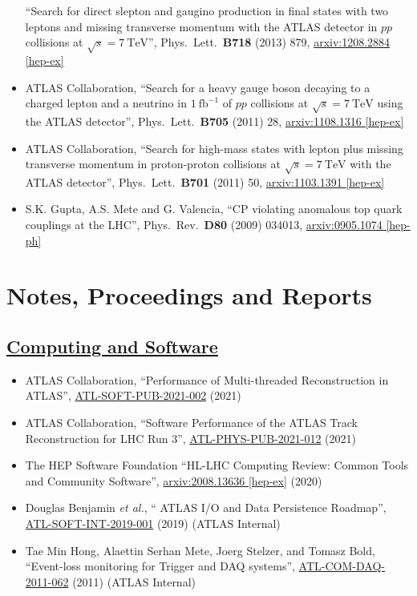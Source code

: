 \documentclass[a4paper,10pt]{article}
\begin{document}
\begin{itemize}
	``Search for direct slepton and gaugino production in final states with two leptons and missing transverse momentum with the ATLAS detector in $pp$ collisions at $\sqrt{s} = 7\ \mathrm{TeV}$'', 
	Phys.\ Lett.\ {\bf B718} (2013) 879, \href{http://arxiv.org/abs/1208.2884}{arxiv:1208.2884 [hep-ex]}
	\item ATLAS Collaboration,
	``Search for a heavy gauge boson decaying to a charged lepton and a neutrino in $1\ \mathrm{fb}^{-1}$ of $pp$ collisions at $\sqrt{s} = 7\ \mathrm{TeV}$ using the ATLAS detector'', 
	Phys.\ Lett.\ {\bf B705} (2011) 28, 
	\href{http://arxiv.org/abs/arXiv:1108.1316}{arxiv:1108.1316 [hep-ex]}
	\item ATLAS Collaboration,
	``Search for high-mass states with lepton plus missing transverse momentum in proton-proton collisions at $\sqrt{s} = 7\ \mathrm{TeV}$ with the ATLAS detector'', 
	Phys.\ Lett.\ {\bf B701} (2011) 50, 
	\href{http://arxiv.org/abs/1103.1391}{arxiv:1103.1391 [hep-ex]}
	\item S.K. Gupta, A.S. Mete and G. Valencia,
	``CP violating anomalous top quark couplings at the LHC'',  
	Phys.\ Rev.\ {\bf D80} (2009) 034013, 
	\href{http://arxiv.org/abs/0905.1074}{arxiv:0905.1074 [hep-ph]}
\end{itemize}


\section{Notes, Proceedings and Reports}
\vspace{1mm}
\subsection{\underline{Computing and Software}}
\vspace{1mm}
\begin{itemize}
	\item ATLAS Collaboration,
	``Performance of Multi-threaded Reconstruction in ATLAS'',
	\href{https://atlas.web.cern.ch/Atlas/GROUPS/PHYSICS/PUBNOTES/ATL-SOFT-PUB-2021-002/}{ATL-SOFT-PUB-2021-002} (2021)
	\item ATLAS Collaboration,
	``Software Performance of the ATLAS Track Reconstruction for LHC Run 3'',
	\href{https://atlas.web.cern.ch/Atlas/GROUPS/PHYSICS/PUBNOTES/ATL-PHYS-PUB-2021-012/}{ATL-PHYS-PUB-2021-012} (2021)
	\item The HEP Software Foundation
	``HL-LHC Computing Review: Common Tools and Community Software'',
	\href{https://arxiv.org/abs/2008.13636}{arxiv:2008.13636 [hep-ex]} (2020)
	\item Douglas Benjamin {\it et al.},
	`` ATLAS I/O and Data Persistence Roadmap'',
	\href{https://cds.cern.ch/record/2673823}{ATL-SOFT-INT-2019-001} (2019) (ATLAS Internal)
	\item Tae Min Hong, Alaettin Serhan Mete, Joerg Stelzer, and Tomasz Bold,
	``Event-loss monitoring for Trigger and DAQ systems'',
	\href{https://cds.cern.ch/record/1373662}{ATL-COM-DAQ-2011-062} (2011) (ATLAS Internal)
\end{itemize}
\vspace{1mm}
\end{document}
